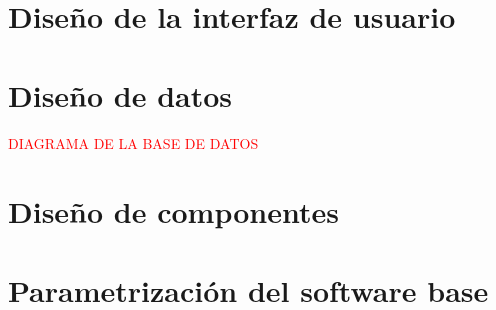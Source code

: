 %

\section{Diseño de la interfaz de usuario}

\section{Diseño de datos}
\textcolor{red}{DIAGRAMA DE LA BASE DE DATOS}

\section{Diseño de componentes}

\section{Parametrización del software base}